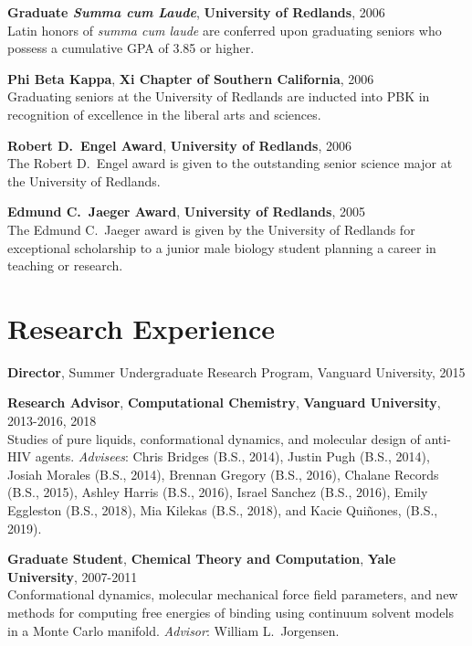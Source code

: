 \documentclass[10pt]{article}
\newcommand*\eduitem[4]{\textbf{#1}, \textbf{#2}, #3\\#4}
\newcommand*\resitem[7]{\textbf{#1}, \textbf{#2}, \textbf{#3}, #4\\#5 \textit{#6}: #7}
\begin{document}
\eduitem{Graduate \textit{Summa cum Laude}}{University of Redlands}{2006}
{Latin honors of \textit{summa cum laude} are conferred upon graduating seniors who possess a cumulative 
GPA of 3.85 or higher.}

\eduitem{Phi Beta Kappa}{Xi Chapter of Southern California}{2006}
{Graduating seniors at the University of Redlands are inducted into PBK in recognition of excellence 
in the liberal arts and sciences.}

\eduitem{Robert D.\ Engel Award}{University of Redlands}{2006}
{The Robert D.\ Engel award is given to the outstanding senior 
science major at the University of Redlands.}

\eduitem{Edmund C.\ Jaeger Award}{University of Redlands}{2005}
{The Edmund C.\ Jaeger award is given by the University of Redlands for exceptional scholarship 
to a junior male biology student planning a career in teaching or research.}


\section{Research Experience}


\textbf{Director}, Summer Undergraduate Research Program, Vanguard University, 2015 

\resitem{Research Advisor}{Computational Chemistry}{Vanguard University}{2013-2016, 2018}
{Studies of pure liquids, conformational dynamics, and molecular design of anti-HIV agents.}
{Advisees}{Chris Bridges (B.S., 2014), Justin Pugh (B.S., 2014), Josiah Morales (B.S., 2014), Brennan Gregory (B.S., 2016), Chalane Records (B.S., 2015), Ashley Harris (B.S., 2016),  Israel Sanchez (B.S., 2016), Emily Eggleston (B.S., 2018), Mia Kilekas (B.S., 2018), and Kacie Qui\~nones, (B.S., 2019).}

\resitem{Graduate Student}{Chemical Theory and Computation}{Yale University}{2007-2011}
{Conformational dynamics, molecular mechanical 
force field parameters, and new methods for computing free 
energies of binding using continuum solvent models in a Monte Carlo 
manifold.}{Advisor}{William L.\ Jorgensen.}
\end{document}
